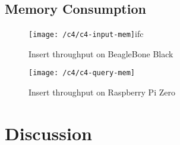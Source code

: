 \newpage
\subsection{Memory Consumption}

\begin{figure}[ht!]
    \centering
    \texttt{[image: /c4/c4-input-mem]}ifc
    \caption{Insert throughput on BeagleBone Black}
    \label{fig:4-3-BBB}
\end{figure}

\begin{figure}[ht!]
    \centering
    \texttt{[image: /c4/c4-query-mem]}
    \caption{Insert throughput on Raspberry Pi Zero}
    \label{fig:4-3-PI0}
\end{figure}
\newpage

\section{Discussion}























